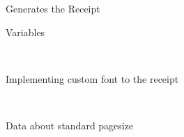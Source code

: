 Generates the Receipt 

Variables 

~\newline
~\newline
~\newline
~\newline
~\newline
~\newline
~\newline
~\newline
~\newline
~\newline
~\newline
~\newline
~\newline
~\newline
~\newline
~\newline
 

Implementing custom font to the receipt 

~\newline
~\newline
~\newline
~\newline
~\newline
~\newline
~\newline
~\newline
~\newline
~\newline
~\newline
~\newline
~\newline
~\newline
~\newline
 

Data about standard pagesize 

~\newline
~\newline
~\newline
~\newline
~\newline
~\newline
~\newline
~\newline
~\newline
~\newline
~\newline
~\newline
~\newline
~\newline
 

